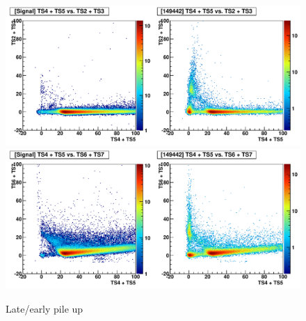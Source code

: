 \begin{figure}[htbp]
   \includegraphics[width=120mm]{DailyLog/6371/6371_Comparison_HTS45VsTS23}
   \includegraphics[width=120mm]{DailyLog/6371/6371_Comparison_HTS45VsTS67}
   \caption{Late/early pile up}
   \label{Figure_6371_EarlyLatePulses}
\end{figure}



